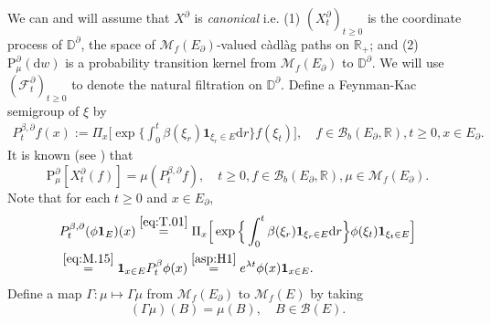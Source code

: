 \documentclass[12pt,a4paper]{amsart}
\numberwithin{equation}{section}
\theoremstyle{plain}
\theoremstyle{definition}
\theoremstyle{remark}
\begin{document}
	We can and will assume that $X^\partial$ is \emph{canonical}  i.e.
	(1) $(X^\partial_t)_{t\geq 0}$ is the coordinate process of $\mathbb D^\partial$, the space of $\mathcal M_f(E_\partial)$-valued c\`adl\`ag paths on $\mathbb R_+$; and 
	(2) $\mathrm P^\partial_\mu(\mathrm dw)$ is a probability transition kernel from $\mathcal M_f(E_\partial)$ to $\mathbb D^\partial$.
	We will use $(\mathscr F^\partial_t)_{t\geq 0}$ to denote the natural filtration on $\mathbb D^\partial$.
	Define a Feynman-Kac semigroup of $\xi$ by
\begin{align} \label{eq:T.01}
	P_t^{\beta,\partial} f(x)
	:= \Pi_x\Big[\exp\Big\{\int_0^t \beta(\xi_r) \mathbf 1_{\xi_r\in E} {\mathrm d}r \Big\} f(\xi_t) \Big],
	\quad f\in \mathcal B_b(E_\partial,\mathbb R), t\geq 0, x\in E_\partial.
\end{align}
	It is known (see \cite[Proposition 2.27]{Li2011Measure-valued}) that
\begin{equation} \label{eq:T.02}
	\mathrm P_\mu^\partial [X^\partial_t(f)] = \mu (P_t^{\beta,\partial} f),
	\quad t\geq 0, f \in \mathcal B_b(E_\partial,\mathbb R), \mu \in \mathcal M_f(E_\partial).
\end{equation}
	Note that for each $t\geq 0$ and $x\in E_\partial$,
\begin{align}
	& P_t^{\beta,\partial} (\phi \mathbf 1_E) (x)
	\overset{\eqref{eq:T.01}}= \Pi_x\Big[\exp\Big\{\int_0^t \beta(\xi_r) \mathbf 1_{\xi_r\in E} {\mathrm d}r \Big\} \phi(\xi_t) \mathbf 1_{\xi_t \in E} \Big]
	\\\label{eq:T.03}&\overset{\eqref{eq:M.15}} = \mathbf 1_{x\in E}P_t^\beta \phi (x)
	\overset{\eqref{asp:H1}} = e^{\lambda t} \phi (x)\mathbf 1_{x\in E}.
\end{align}
	Define a map $\Gamma: \mu \mapsto \Gamma \mu$ from $\mathcal M_f(E_\partial)$ to $\mathcal M_f(E)$ by taking
\[
	(\Gamma \mu)(B) = \mu(B), \quad B\in \mathscr B(E).
\]
	
\end{document}
